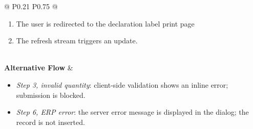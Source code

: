\begin{longtable}{@{} P{0.21\linewidth} P{0.75\linewidth} @{}}
\begin{enumerate}[nosep, leftmargin=*]
	\item The user is redirected to the declaration label print page
	\item The refresh stream triggers an update.
	\end{enumerate} \\
	\midrule
	\textbf{Alternative Flow} & 
	\begin{itemize}[nosep, leftmargin=*]
	\item \textit{Step 3, invalid quantity}: client-side validation shows an inline error; submission is blocked.
	\item \textit{Step 6, ERP error}: the server error message is displayed in the dialog; the record is not inserted.
	\end{itemize} \\
\end{longtable}

